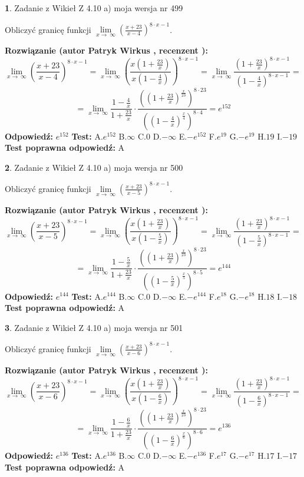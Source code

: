 \documentclass[12pt, a4paper]{article}
\theoremstyle{definition} %
\newtheorem{zad}{}
\newcommand{\zadStart}[1]{\begin{zad}#1\newline}
\newcommand{\zadStop}{\end{zad}}
\newcommand{\rozwStart}[2]{\noindent \textbf{Rozwiązanie (autor #1 , recenzent #2): }\newline}
\newcommand{\rozwStop}{\newline}
\newcommand{\odpStart}{\noindent \textbf{Odpowiedź:}\newline}
\newcommand{\odpStop}{\newline}
\newcommand{\testStart}{\noindent \textbf{Test:}\newline}
\newcommand{\testStop}{\newline}
\newcommand{\kluczStart}{\noindent \textbf{Test poprawna odpowiedź:}\newline}
\newcommand{\kluczStop}{\newline}
\begin{document}
\zadStart{Zadanie z Wikieł Z 4.10 a) moja wersja nr 499}

Obliczyć granicę funkcji  $\lim\limits_{x\to\ \infty}(\frac{x+23}{x-4})^{8\cdot x-1}$.
\zadStop
\rozwStart{Patryk Wirkus}{}
$$\lim\limits_{x\to\ \infty}(\frac{x+23}{x-4})^{8\cdot x-1} = \lim\limits_{x\to\ \infty}(\frac{x(1+\frac{23}{x})}{x(1-\frac{4}{x})})^{8\cdot x-1}=\lim\limits_{x\to\ \infty}\frac{(1+\frac{23}{x})^{8\cdot x-1}}{(1-\frac{4}{x})^{8\cdot x-1}}=$$
$$=\lim\limits_{x\to\ \infty}\frac{1-\frac{4}{x}}{1+\frac{23}{x}}\cdot\frac{((1+\frac{23}{x})^{\frac{x}{23}})^{8\cdot23}}{((1-\frac{4}{x})^{\frac{x}{4}})^{8\cdot4}}=e^{152}$$
\rozwStop
\odpStart
$e^{152}$
\odpStop
\testStart
A.$e^{152}$ B.$\infty$ C.$0$ D.$-\infty$ E.$-e^{152}$
F.$e^{19}$ G.$-e^{19}$
H.$19$
I.$-19$
\testStop
\kluczStart
A
\kluczStop



\zadStart{Zadanie z Wikieł Z 4.10 a) moja wersja nr 500}

Obliczyć granicę funkcji  $\lim\limits_{x\to\ \infty}(\frac{x+23}{x-5})^{8\cdot x-1}$.
\zadStop
\rozwStart{Patryk Wirkus}{}
$$\lim\limits_{x\to\ \infty}(\frac{x+23}{x-5})^{8\cdot x-1} = \lim\limits_{x\to\ \infty}(\frac{x(1+\frac{23}{x})}{x(1-\frac{5}{x})})^{8\cdot x-1}=\lim\limits_{x\to\ \infty}\frac{(1+\frac{23}{x})^{8\cdot x-1}}{(1-\frac{5}{x})^{8\cdot x-1}}=$$
$$=\lim\limits_{x\to\ \infty}\frac{1-\frac{5}{x}}{1+\frac{23}{x}}\cdot\frac{((1+\frac{23}{x})^{\frac{x}{23}})^{8\cdot23}}{((1-\frac{5}{x})^{\frac{x}{5}})^{8\cdot5}}=e^{144}$$
\rozwStop
\odpStart
$e^{144}$
\odpStop
\testStart
A.$e^{144}$ B.$\infty$ C.$0$ D.$-\infty$ E.$-e^{144}$
F.$e^{18}$ G.$-e^{18}$
H.$18$
I.$-18$
\testStop
\kluczStart
A
\kluczStop



\zadStart{Zadanie z Wikieł Z 4.10 a) moja wersja nr 501}

Obliczyć granicę funkcji  $\lim\limits_{x\to\ \infty}(\frac{x+23}{x-6})^{8\cdot x-1}$.
\zadStop
\rozwStart{Patryk Wirkus}{}
$$\lim\limits_{x\to\ \infty}(\frac{x+23}{x-6})^{8\cdot x-1} = \lim\limits_{x\to\ \infty}(\frac{x(1+\frac{23}{x})}{x(1-\frac{6}{x})})^{8\cdot x-1}=\lim\limits_{x\to\ \infty}\frac{(1+\frac{23}{x})^{8\cdot x-1}}{(1-\frac{6}{x})^{8\cdot x-1}}=$$
$$=\lim\limits_{x\to\ \infty}\frac{1-\frac{6}{x}}{1+\frac{23}{x}}\cdot\frac{((1+\frac{23}{x})^{\frac{x}{23}})^{8\cdot23}}{((1-\frac{6}{x})^{\frac{x}{6}})^{8\cdot6}}=e^{136}$$
\rozwStop
\odpStart
$e^{136}$
\odpStop
\testStart
A.$e^{136}$ B.$\infty$ C.$0$ D.$-\infty$ E.$-e^{136}$
F.$e^{17}$ G.$-e^{17}$
H.$17$
I.$-17$
\testStop
\kluczStart
A
\kluczStop
\end{document}

